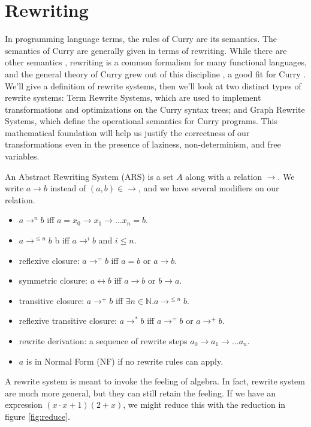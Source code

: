 \documentclass{book}
\def\N{\mathbb{N}}
\theoremstyle{definition}
\renewcommand{\leq}{\leqslant}
\begin{document}
\section{Rewriting}
In programming language terms, the rules of Curry are its semantics.
The semantics of Curry are generally given in terms of rewriting.
\cite{IntegrationFunLog, FunLog, Needed}
While there are other semantics \cite{currySemantics, crwl, monadSemantics}, 
rewriting is a common formalism for many functional languages,
and the general theory of Curry grew out of this discipline \cite{Needed},
a good fit for Curry \cite{CurryReport}.
We'll give a definition of rewrite systems,
then we'll look at two distinct types of rewrite systems:
Term Rewrite Systems, which are used to implement transformations and optimizations
on the Curry syntax trees;
and Graph Rewrite Systems, which define the operational semantics for Curry programs.
This mathematical foundation will help us justify the correctness of our transformations
even in the presence of laziness, non-determinism, and free variables.

An Abstract Rewriting System (ARS)
is a set $A$ along with a relation $\to$\index{$\to$}.
We write $a \to b$ instead of $(a,b) \in \to$, and we have several modifiers on our relation.
\begin{itemize}
    \item $a \to^n b$ iff $a = x_0 \to x_1 \to \ldots x_n = b$.
    \item $a \to^{\le n} b$ b iff $a \to^i b$ and $i \leq n$.
    \item reflexive closure: $a \to^= b$\index{$\to^=$} iff $a = b$ or $a \to b$.
    \item symmetric closure: $a \leftrightarrow b$\index{$\leftrightarrow$} iff $a \to b$ or $b \to a$.
    \item transitive closure: $a \to^+ b$\index{$\to^+$} iff $\exists n\in \N. a \to^{\le n} b$.
    \item reflexive transitive closure: $a \to^* b$ iff $a \to^= b$ or $a \to^+ b$.
    \item rewrite derivation: 
          a sequence of rewrite steps $a_0 \to a_1 \to \ldots a_n$.
    \item $a$ is in Normal Form (NF) if no rewrite rules can apply.
\end{itemize}

A rewrite system is meant to invoke the feeling of algebra.
In fact, rewrite system are much more general, but they can still retain the feeling.
If we have an expression $(x\cdot x + 1)(2 + x)$, we might reduce this with the reduction in figure \ref{fig:reduce}.
\end{document}
